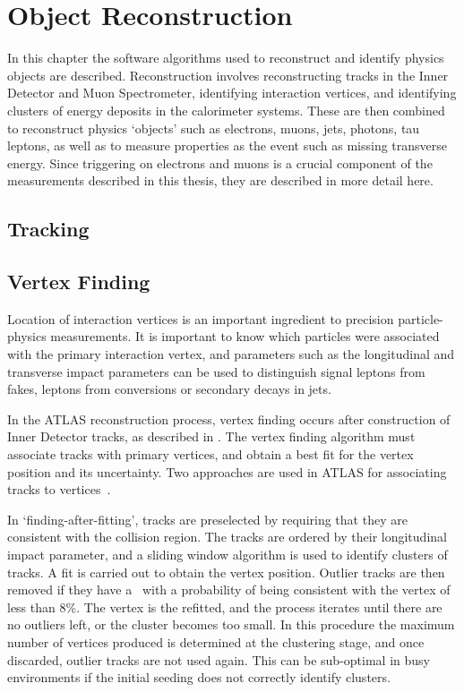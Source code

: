 \graphicspath{{Figures/}}

\chapter{Object Reconstruction}
\label{chap:Reconstruction}

In this chapter the software algorithms used to reconstruct and identify physics
objects are described. Reconstruction involves reconstructing tracks in the
Inner Detector and Muon Spectrometer, identifying interaction vertices,
and identifying clusters of energy deposits in the calorimeter systems. These are
then combined to reconstruct physics `objects' such as electrons, muons, jets, photons,
tau leptons, as well as to measure properties as the event such as missing
transverse energy. 
Since triggering on electrons and muons is a crucial component of the
measurements described in this thesis, they are described in more detail here.

\section{Tracking}
\label{sec:reco-tracking}



\section{Vertex Finding}
\label{sec:reco-vertexing}

Location of interaction vertices is an important ingredient to precision
particle-physics measurements. It is important to know which particles were
associated with the primary interaction vertex, and parameters such as the
longitudinal and transverse impact parameters can be used to distinguish signal
leptons from fakes, leptons from conversions or secondary decays in jets.

In the ATLAS reconstruction process, vertex finding occurs after construction of
Inner Detector tracks, as described in . The
vertex finding algorithm must associate tracks with primary vertices, and obtain
a best fit for the vertex position and its uncertainty. Two approaches are
used in ATLAS for associating tracks to vertices~\cite{1742-6596-119-3-032033}. 

In `finding-after-fitting',
tracks are preselected by requiring that they are consistent with the collision
region. The tracks are ordered by their longitudinal impact parameter, and a
sliding window algorithm is used to identify clusters of tracks. A fit is 
carried out to obtain the vertex position. Outlier tracks are then removed if
they have a \chisquared\ with a probability of being consistent with the vertex
of less than 8\%. The vertex is the refitted, and the process iterates until
there are no outliers left, or the cluster becomes too small. In this procedure
the maximum number of vertices produced is determined at the clustering stage, and
once discarded, outlier tracks are not used again. This can be sub-optimal in
busy environments if the initial seeding does not correctly identify clusters.

